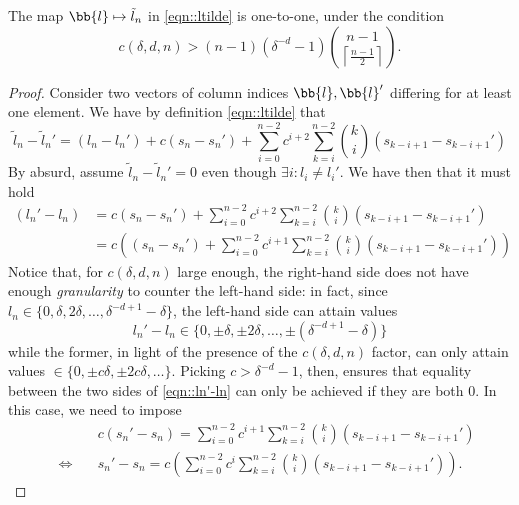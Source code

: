 \begin{lemma}
\label{thm::ln_1to1}
The map $\bb{l}\mapsto\tilde l_n$ in \cref{eqn::ltilde} is one-to-one, under the condition 
\begin{equation}
    c(\delta,d,n)>(n-1)(\delta^{-d}-1)\binom{n-1}{\left\lceil\frac{n-1}{2}\right\rceil}.
    \label{eqn::condition_on_c_final}
\end{equation}
\end{lemma}
\begin{proof}
Consider two vectors of column indices $\bb{l},\bb{l}'$ differing for at least one element. We have by definition \cref{eqn::ltilde} that
\begin{equation}
    \tilde{l}_n-\tilde{l}_n' = 
        (l_n-l_n') + c(s_n-s_n')
        +\sum_{i=0}^{n-2}c^{i+2}\sum_{k=i}^{n-2}\binom{k}{i}(s_{k-i+1}-s_{k-i+1}')
\end{equation}
By absurd, assume $\tilde{l}_n-\tilde{l}_n'=0$ even though $\exists i:l_i\neq l_i'$. We have then that it must hold
\begin{equation}
\begin{split}
    (l_n'-l_n) &= c(s_n-s_n')
    +\sum_{i=0}^{n-2}c^{i+2}\sum_{k=i}^{n-2}\binom{k}{i}(s_{k-i+1}-s_{k-i+1}')\\
    &=c\left((s_n-s_n')
    +\sum_{i=0}^{n-2}c^{i+1}\sum_{k=i}^{n-2}\binom{k}{i}(s_{k-i+1}-s_{k-i+1}')\right)
\end{split}
\label{eqn::ln'-ln}
\end{equation}
Notice that, for $c(\delta,d,n)$ large enough, the right-hand side does not have enough \emph{granularity} to counter the left-hand side: in fact, since $l_n\in\{0,\delta,2\delta,\dots,\delta^{-d+1}-\delta\}$, the left-hand side can attain values
\begin{equation}
    l_n'-l_n\in\{0,\pm\delta,\pm2\delta,\dots,\pm(\delta^{-d+1}-\delta)\}
\end{equation}
while the former, in light of the presence of the $c(\delta,d,n)$ factor, can only attain values $\in\{0,\pm c\delta,\pm2c\delta,\dots\}$. Picking $c>\delta^{-d}-1$, then, ensures that equality between the two sides of \cref{eqn::ln'-ln} can only be achieved if they are both $0$. In this case, we need to impose
\begin{equation}
\begin{split}
    &c(s_n'-s_n) = 
    \sum_{i=0}^{n-2}c^{i+1}\sum_{k=i}^{n-2}\binom{k}{i}(s_{k-i+1}-s_{k-i+1}')\\
    \quad\Longleftrightarrow\quad& s_n'-s_n %
    =c\left(\sum_{i=0}^{n-2}c^i\sum_{k=i}^{n-2}\binom{k}{i}(s_{k-i+1}-s_{k-i+1}')\right).

\end{split}
\end{equation}
\end{proof}
